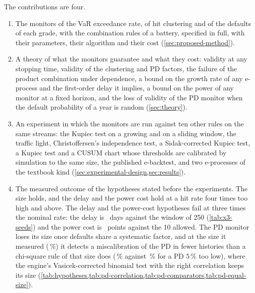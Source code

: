 The contributions are four.
\begin{enumerate}
\item The monitors of the VaR exceedance rate, of hit clustering and of the defaults of each grade, with the combination rules of a battery, specified in full, with their
parameters, their algorithm and their cost (\cref{sec:proposed-method}).
\item A theory of what the monitors guarantee and what they cost: validity at any stopping time, validity of the clustering and PD factors, the failure of the
product combination under dependence, a bound on the growth rate of any e-process and the first-order delay it implies, a bound on the power of any monitor at a fixed horizon, and the
loss of validity of the PD monitor when the default probability of a year is random (\cref{sec:theory}).
\item An experiment in which the monitors are run against ten other rules on the same streams: the Kupiec test on a growing and on a sliding window, the traffic light,
Christoffersen's independence test, a Sidak-corrected Kupiec test, a Kupiec test and a CUSUM chart whose thresholds are calibrated by simulation to the same size, the published
e-backtest, and two e-processes of the textbook kind (\cref{sec:experimental-design,sec:results}).
\item The measured outcome of the hypotheses stated before the experiments. The size holds, and the delay and the power cost hold at a hit rate four times too high and above. The delay and the power-cost hypotheses fail at three times the nominal rate: the delay is \nSeedsThreeMed\ days against the window of 250 (\cref{tab:x3-seeds}) and the power cost is \nSeedsThreeCost\ points against the 10 allowed. The PD monitor loses its size once defaults share a systematic factor, and at the size it measured (\nPdcMatchedSize\,\%) it detects a miscalibration of the PD in fewer histories than a chi-square rule of that size does (\nPdOneZeroFiveAvg\,\% against \nPdcOneZeroFiveChiMatched\,\% for a PD $5\,\%$ too low), where the engine's Vasicek-corrected binomial test with the right correlation keeps its size
(\cref{tab:hypotheses,tab:pd-correlation,tab:pd-comparators,tab:pd-equal-size}).
\end{enumerate}

